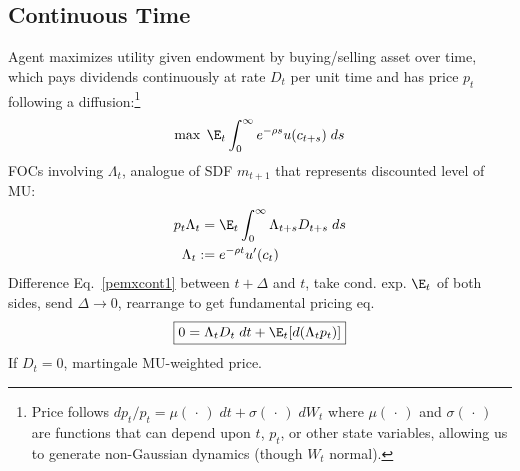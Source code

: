 \documentclass[12pt]{article}
\theoremstyle{plain}
\theoremstyle{definition}
\theoremstyle{remark}
\newcommand{\ra}{\rightarrow}
\begin{document}
\begin{multicols*}{2}
\clearpage
\subsection{Continuous Time}

Agent maximizes utility given endowment by buying/selling asset over
time, which pays dividends continuously at rate $D_t$ per unit time and
has price $p_t$ following a diffusion:\footnote{%
  Price follows
  $dp_t/p_t = \mu(\,\cdot\,)\; dt + \sigma(\,\cdot\,) \; dW_t$
  where $\mu(\,\cdot\,)$ and $\sigma(\,\cdot\,)$ are functions that can
  depend upon $t$, $p_t$, or other state variables, allowing
  us to generate non-Gaussian dynamics (though $W_t$ normal).
}
\begin{align*}
  \max \;
  \E_t \int_{0}^\infty e^{-\rho s} u(c_{t+s})\; ds
\end{align*}
FOCs involving $\Lambda_t$, analogue of SDF $m_{t+1}$ that represents
discounted level of MU:
\begin{align}
  p_t\Lambda_t
  =&\; \E_t
  \int_{0}^\infty \Lambda_{t+s}D_{t+s}\; ds
  \label{pemxcont1}
  \\
  \Lambda_t :=&\; e^{-\rho t} u'(c_t)
\end{align}
Difference Eq.~\ref{pemxcont1} between $t+\Delta$ and $t$, take cond.
exp. $\E_t$ of both sides, send $\Delta\ra 0$, rearrange to get
fundamental pricing eq.
\begin{align}
  \boxed{%
  0 = \Lambda_t D_t \;dt + \E_t[d(\Lambda_tp_t)]
  }
  \label{pemxcont2}
\end{align}
If $D_t=0$, martingale MU-weighted price.


\end{multicols*}
\end{document}
